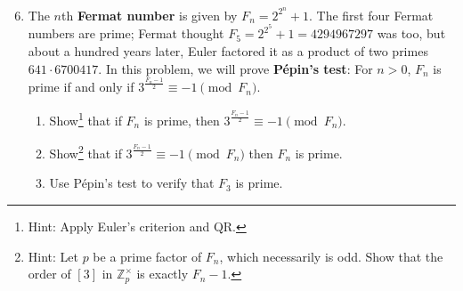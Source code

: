 \documentclass{amsart}
\def\Z{\mathbb Z}
\begin{document}
\

\begin{enumerate}\setcounter{enumi}{5}

\item The $n$th \textbf{Fermat number} is given by $F_n = 2^{2^n} +1$. The first four Fermat numbers are prime; Fermat thought $F_5=2^{2^5} +1=4294967297$ was too, but about a hundred years later, Euler factored it as a product of two primes $641 \cdot  6700417$. In this problem, we will prove \textbf{P\'epin's test}: For $n>0$, $F_n$ is prime if and only if $\displaystyle 3^{\frac{F_n-1}{2}} \equiv -1 \pmod{F_n}$.
\begin{enumerate}
\item Show\footnote{Hint: Apply Euler's criterion and QR.}  that if $F_n$ is prime, then $3^{\frac{F_n-1}{2}} \equiv -1 \pmod{F_n}$.
\item Show\footnote{Hint: Let $p$ be a prime factor of $F_n$, which necessarily is odd. Show that the order of $[3]$ in $\Z_p^\times$ is exactly $F_n-1$.} that if $3^{\frac{F_n-1}{2}}  \equiv -1 \pmod{F_n}$ then $F_n$ is prime.
\item Use P\'epin's test to verify that $F_3$ is prime.
\end{enumerate}






\end{enumerate}
\end{document}
